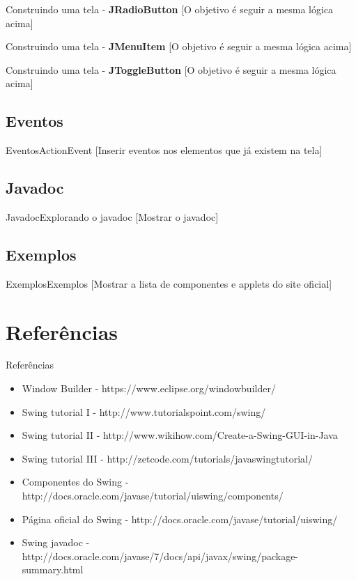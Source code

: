 \documentclass[10pt]{beamer}
\begin{document}
\begin{frame}{Construindo uma tela - \textbf{JRadioButton}}
[O objetivo é seguir a mesma lógica acima]
\end{frame}{}


\begin{frame}{Construindo uma tela - \textbf{JMenuItem}}
[O objetivo é seguir a mesma lógica acima]
\end{frame}{}

\begin{frame}{Construindo uma tela - \textbf{JToggleButton}}
[O objetivo é seguir a mesma lógica acima]
\end{frame}{}

\subsection{Eventos}
\begin{frame}{Eventos}{ActionEvent}
[Inserir eventos nos elementos que já existem na tela]
\end{frame}{}

\subsection{Javadoc}
\begin{frame}{Javadoc}{Explorando o javadoc}
[Mostrar o javadoc]
\end{frame}{}

\subsection{Exemplos}
\begin{frame}{Exemplos}{Exemplos}
[Mostrar a lista de componentes e applets do site oficial]
\end{frame}{}


\section{Referências}
\begin{frame}{Referências}{}
\begin{itemize}
\item Window Builder - https://www.eclipse.org/windowbuilder/
\item Swing tutorial I - http://www.tutorialspoint.com/swing/
\item Swing tutorial II - http://www.wikihow.com/Create-a-Swing-GUI-in-Java
\item Swing tutorial III - http://zetcode.com/tutorials/javaswingtutorial/
\item Componentes do Swing  - http://docs.oracle.com/javase/tutorial/uiswing/components/
\item Página oficial do Swing - http://docs.oracle.com/javase/tutorial/uiswing/
\item Swing javadoc - http://docs.oracle.com/javase/7/docs/api/javax/swing/package-summary.html
\end{itemize}
\end{frame}
\end{document}
